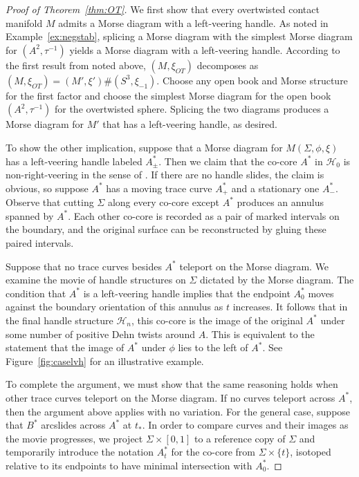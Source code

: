 \documentclass{amsart}
\theoremstyle{definition}
\def\H{\mathcal{H}}
\begin{document}
\begin{proof}[Proof of Theorem~\ref{thm:OT}]
We first show that every overtwisted contact manifold $M$ admits a Morse diagram with a left-veering handle.  As noted in Example~\ref{ex:negstab}, splicing a Morse diagram with the simplest Morse diagram for $(A^2, \tau^{-1})$ yields a Morse diagram with a left-veering handle.  According to the first result from \cite{HKM} noted above, $(M, \xi_{OT})$ decomposes as $(M, \xi_{OT})=(M', \xi') \# (S^3, \xi_{-1})$.  Choose any open book and Morse structure for the first factor and choose the simplest Morse diagram for the open book $(A^2, \tau^{-1})$ for the overtwisted sphere.  Splicing the two diagrams produces a Morse diagram for $M'$ that has a left-veering handle, as desired.  


To show the other implication, suppose that a Morse diagram for $M(\Sigma, \phi, \xi)$  has a left-veering handle labeled $A^*_\pm$.  Then we claim that the co-core $A^*$ in $\H_0$ is non-right-veering in the sense of \cite{HKM}.   If there are no handle slides, the claim is obvious, so suppose $A^*$ has a moving trace curve $A^*_+$ and a stationary one $A^*_-$.  Observe that cutting $\Sigma$ along every co-core except $A^*$ produces an annulus spanned by $A^*$.  Each other co-core is recorded as a pair of marked intervals on the boundary, and the original surface can be reconstructed by gluing these paired intervals.  


Suppose that no trace curves besides $A^*$ teleport on the Morse diagram.  We examine the movie of handle structures on $\Sigma$ dictated by the Morse diagram.  The condition that $A^*$ is a left-veering handle implies that the endpoint $A^*_0$ moves against the boundary orientation of this annulus as $t$ increases.  It follows that in the final handle structure $\H_n$, this co-core is the image of the original $A^*$ under some number of positive Dehn twists around $A$.  This is equivalent to the statement that the image of $A^*$ under $\phi$ lies to the left of $A^*$.  See Figure~\ref{fig:caselvh} for an illustrative example. 



To complete the argument, we must show that the same reasoning holds when other trace curves teleport on the Morse diagram.  If no curves teleport across $A^*$, then the argument above applies with no variation.  For the general case, suppose that $B^*$ arcslides across $A^*$ at $t_*$.  In order to compare curves and their images as the movie progresses, we project $\Sigma\times [0,1]$ to a reference copy of $\Sigma$ and temporarily introduce the notation $A^*_t$ for the co-core from $\Sigma\times\{t\}$,  isotoped relative to its endpoints to have minimal intersection with $A^*_0$.


\end{proof}
\end{document}
